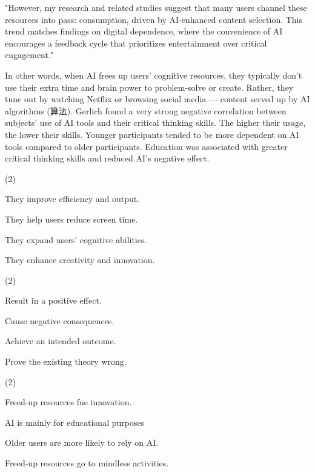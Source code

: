 \documentclass{英语试卷}
\begin{document}
\par "However, my research and related studies suggest that many users channel these resources into pass: consumption, driven by AI-enhanced content selection. This trend matches findings on digital dependence, where the convenience of AI encourages a feedback cycle that prioritizes entertainment over critical engagement."\par
\par In other words, when AI frees up users' cognitive resources, they typically don't use their extra time and brain power to problem-solve or create. Rather, they tune out by watching Netflix or browsing social media — content served up by AI algorithms (算法). Gerlich found a very strong negative correlation between subjects' use of AI tools and their critical thinking skills. The higher their usage, the lower their skills. Younger participants tended to be more dependent on AI tools compared to older participants. Education was associated with greater critical thinking skills and reduced AI's negative effect.\par
{}
\begin{choices}(2)
  \item They improve efficiency and output.
  \item They help users reduce screen time.
  \item They expand users' cognitive abilities.
  \item They enhance creativity and innovation.
\end{choices}
\begin{choices}(2)
  \item Result in a positive effect.
  \item Cause negative consequences.
  \item Achieve an intended outcome.
  \item Prove the existing theory wrong.
\end{choices}
\begin{choices}(2)
  \item Freed-up resources fue innovation.
  \item AI is mainly for educational purposes
  \item Older users are more likely to rely on AI.
  \item Freed-up resources go to mindless activities.
\end{choices}
\end{document}
